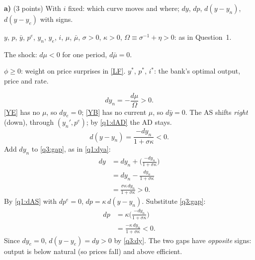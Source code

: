\textbf{a)} (3 points) With $i$ fixed: which curve moves and where; $dy$, $dp$, $d(y-y_n)$, $d(y-y_e)$ with signs.
\resolespaco
\begin{sol}
\begin{notacao}
\item $y$, $p$, $\bar y$, $p^e$, $y_n$, $y_e$, $i$, $\mu$, $\bar\mu$, $\sigma>0$, $\kappa>0$, $\Omega\equiv\sigma^{-1}+\eta>0$: as in Question~1.
\item The shock: $d\mu<0$ for one period, $d\bar\mu=0$.
\item $\phi\ge0$: weight on price surprises in \eqref{LF}. $y^*$, $p^*$, $i^*$: the bank's optimal output, price and rate.
\end{notacao}
\begin{equation}
dy_n=-\frac{d\mu}{\Omega}>0 . \label{q3:dyn}
\end{equation}
\eqref{YE} has no $\mu$, so $dy_e=0$; \eqref{YB} has no current $\mu$, so $d\bar y=0$. The AS shifts \emph{right} (down), through $(y_n',p^e)$;
by \eqref{q1:dAD} the AD stays.
\begin{equation}
d(y-y_n)=\frac{-dy_n}{1+\sigma\kappa}<0 . \label{q3:gap}
\end{equation}
Add $dy_n$ to \eqref{q3:gap}, as in \eqref{q1:dya}:
\begin{align}
dy&=dy_n+\Big(\frac{-dy_n}{1+\sigma\kappa}\Big)\nonumber\\
&=dy_n-\frac{dy_n}{1+\sigma\kappa}\nonumber\\
&=\frac{\sigma\kappa\,dy_n}{1+\sigma\kappa}>0 . \label{q3:dy}
\end{align}
By \eqref{q1:dAS} with $dp^e=0$, $dp=\kappa\,d(y-y_n)$. Substitute \eqref{q3:gap}:
\begin{align}
dp&=\kappa\Big(\frac{-dy_n}{1+\sigma\kappa}\Big)\nonumber\\
&=\frac{-\kappa\,dy_n}{1+\sigma\kappa}<0 . \label{q3:dp}
\end{align}
Since $dy_e=0$, $d(y-y_e)=dy>0$ by \eqref{q3:dy}. The two gaps have \emph{opposite} signs: output is below natural (so prices fall)
and above efficient.
\end{sol}

